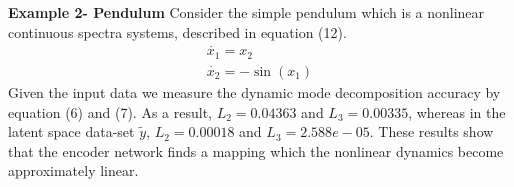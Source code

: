 \documentclass[twocolumn, letterpaper]{scrartcl}
\begin{document}
    \textbf{Example 2- Pendulum}
    Consider the simple pendulum which is a nonlinear continuous spectra systems, described in equation (12).  
    \begin{equation} \label{eq:12}
        \begin{array}{l}
            \dot{x_{1}} = x_{2}\\
            \dot{x_{2}} = -\sin(x_{1})
        \end{array}
    \end{equation}
    Given the input data we measure the dynamic mode decomposition accuracy by equation (6) and (7). As a result, $L_{2} =  0.04363$ and $L_{3} = 0.00335$, whereas in the latent space data-set $\tilde y$, $L_{2} =  0.00018$ and $L_{3} = 2.588e-05$. These results show that the encoder network finds a mapping which the nonlinear dynamics become approximately linear. 
    
\end{document}
